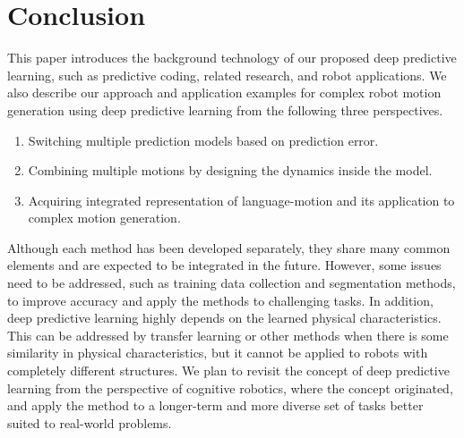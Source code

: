 
\section{Conclusion}

This paper introduces the background technology of our proposed deep predictive learning, such as predictive coding, related research, and robot applications. We also describe our approach and application examples for complex robot motion generation using deep predictive learning from the following three perspectives.


\begin{enumerate}
\renewcommand{\labelenumi}{\roman{enumi}}
\item Switching multiple prediction models based on prediction error.
\item Combining multiple motions by designing the dynamics inside the model.
\item Acquiring integrated representation of language-motion and its application to complex motion generation.
\end{enumerate}


Although each method has been developed separately, they share many common elements and are expected to be integrated in the future. However, some issues need to be addressed, such as training data collection and segmentation methods, to improve accuracy and apply the methods to challenging tasks. In addition, deep predictive learning highly depends on the learned physical characteristics. This can be addressed by transfer learning or other methods when there is some similarity in physical characteristics, but it cannot be applied to robots with completely different structures. We plan to revisit the concept of deep predictive learning from the perspective of cognitive robotics, where the concept originated, and apply the method to a longer-term and more diverse set of tasks better suited to real-world problems.
